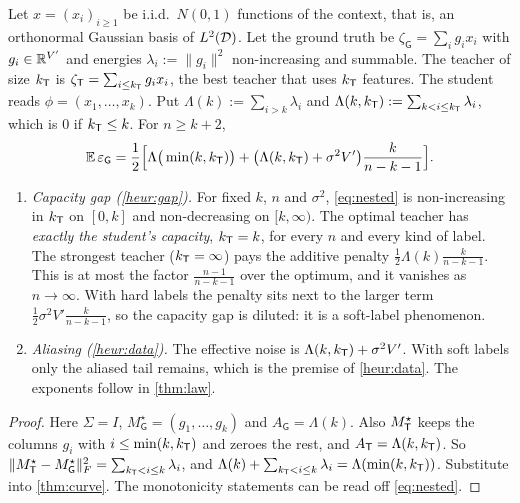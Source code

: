\begin{corollary}\label{cor:nested}
\Mo\Ck Let $x=(x_i)_{i\ge1}$ be i.i.d.\ $N(0,1)$ functions of the context, that is, an orthonormal Gaussian basis of
$L^2(\mathcal{D})$. Let the ground truth be $\zeta_{\mathsf G}=\sum_ig_ix_i$ with $g_i\in\mathbb{R}^{V'}$ and energies $\lambda_i:=\|g_i\|^2$
non-increasing and summable. The teacher of size $k_{\mathsf{T}}$ is $\zeta_{\mathsf{T}}=\sum_{i\le k_{\mathsf{T}}}g_ix_i$, the best teacher that uses $k_{\mathsf{T}}$
features. The student reads $\phi=(x_1,\dots,x_k)$. Put $\Lambda(k):=\sum_{i>k}\lambda_i$ and
$\Lambda(k,k_{\mathsf{T}}):=\sum_{k<i\le k_{\mathsf{T}}}\lambda_i$, which is $0$ if $k_{\mathsf{T}}\le k$. For $n\ge k+2$,
\begin{equation}\label{eq:nested}
\mathbb{E}\,\varepsilon_{\mathsf G}=\frac12\Big[\Lambda\big(\min(k,k_{\mathsf{T}})\big)+\big(\Lambda(k,k_{\mathsf{T}})+\sigma^2V'\big)\frac k{n-k-1}\Big].
\end{equation}
\begin{enumerate}[label=(\alph*),nosep,leftmargin=*]
\item \emph{Capacity gap (\cref{heur:gap}).} For fixed $k$, $n$ and $\sigma^2$, \eqref{eq:nested} is non-increasing in $k_{\mathsf{T}}$ on
$[0,k]$ and non-decreasing on $[k,\infty)$. The optimal teacher has \emph{exactly the student's capacity},
$k_{\mathsf{T}}=k$, for every $n$ and every kind of label. The strongest teacher ($k_{\mathsf{T}}=\infty$) pays the additive
penalty $\frac12\Lambda(k)\frac k{n-k-1}$. This is at most the factor $\frac{n-1}{n-k-1}$ over the optimum, and it
vanishes as $n\to\infty$. With hard labels the penalty sits next to the larger term $\frac12\sigma^2V'\frac k{n-k-1}$, so the
capacity gap is diluted: it is a soft-label phenomenon.
\item \emph{Aliasing (\cref{heur:data}).} The effective noise is $\Lambda(k,k_{\mathsf{T}})+\sigma^2V'$. With soft labels only the
aliased tail remains, which is the premise of \cref{heur:data}. The exponents follow in \cref{thm:law}.
\end{enumerate}
\end{corollary}
\begin{proof}
Here $\Sigma=I$, $M^\star_{\mathsf G}=(g_1,\dots,g_k)$ and $A_{\mathsf G}=\Lambda(k)$. Also $M^\star_{\mathsf{T}}$ keeps the columns $g_i$ with
$i\le\min(k,k_{\mathsf{T}})$ and zeroes the rest, and $A_{\mathsf{T}}=\Lambda(k,k_{\mathsf{T}})$. So
$\|M^\star_{\mathsf{T}}-M^\star_{\mathsf G}\|_F^2=\sum_{k_{\mathsf{T}}<i\le k}\lambda_i$, and $\Lambda(k)+\sum_{k_{\mathsf{T}}<i\le k}\lambda_i=\Lambda(\min(k,k_{\mathsf{T}}))$. Substitute into
\cref{thm:curve}. The monotonicity statements can be read off \eqref{eq:nested}.
\end{proof}

